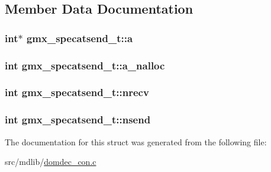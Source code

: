 \subsection{\-Member \-Data \-Documentation}
\hypertarget{structgmx__specatsend__t_a54bcb81cb6a8cd0d3353f57f0ffc6252}{
\subsubsection[{a}]{\setlength{\rightskip}{0pt plus 5cm}int$\ast$ {\bf gmx\-\_\-specatsend\-\_\-t\-::a}}}\label{structgmx__specatsend__t_a54bcb81cb6a8cd0d3353f57f0ffc6252}
\hypertarget{structgmx__specatsend__t_ad04b693f9d38d435435600ed1a99aec2}{
\subsubsection[{a\-\_\-nalloc}]{\setlength{\rightskip}{0pt plus 5cm}int {\bf gmx\-\_\-specatsend\-\_\-t\-::a\-\_\-nalloc}}}\label{structgmx__specatsend__t_ad04b693f9d38d435435600ed1a99aec2}
\hypertarget{structgmx__specatsend__t_a70f7904d11ecac3d762a76b21e31024c}{
\subsubsection[{nrecv}]{\setlength{\rightskip}{0pt plus 5cm}int {\bf gmx\-\_\-specatsend\-\_\-t\-::nrecv}}}\label{structgmx__specatsend__t_a70f7904d11ecac3d762a76b21e31024c}
\hypertarget{structgmx__specatsend__t_a7f2f4145ab0c2f668df0b9efe7bc57b2}{
\subsubsection[{nsend}]{\setlength{\rightskip}{0pt plus 5cm}int {\bf gmx\-\_\-specatsend\-\_\-t\-::nsend}}}\label{structgmx__specatsend__t_a7f2f4145ab0c2f668df0b9efe7bc57b2}


\-The documentation for this struct was generated from the following file\-:\begin{DoxyCompactItemize}
\item 
src/mdlib/\hyperlink{domdec__con_8c}{domdec\-\_\-con.\-c}\end{DoxyCompactItemize}
